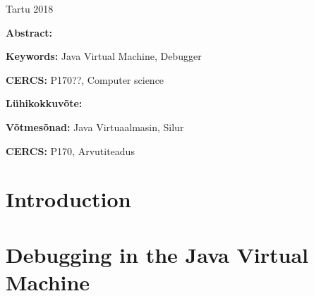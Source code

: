 \documentclass{style/bachelor-thesis}
\begin{document}
\vfill
\centerline{Tartu 2018}


\pagebreak
\listoftodos[Todos]

\pagebreak

\noindent\textbf{\large \articleName}
\vspace*{3ex}
\begin{flushleft}
  \textbf{Abstract:} %
\end{flushleft}


\vspace*{3ex}
\begin{flushleft}
  \textbf{Keywords:} Java Virtual Machine, Debugger
\end{flushleft}
\vspace*{3ex}

\noindent\textbf{CERCS:} P170??, Computer science

\vspace*{5ex}
\noindent\textbf{\large \articleNameEE}
\vspace*{3ex}

\begin{flushleft}
  \textbf{Lühikokkuvõte:} %
\end{flushleft}
\vspace*{3ex}

\begin{flushleft}
  \textbf{Võtmesõnad:} Java Virtuaalmasin, Silur 
\end{flushleft}
\vspace*{3ex}

\noindent\textbf{CERCS:} P170, Arvutiteadus

\newpage




\tableofcontents

\pagebreak


\section{Introduction}


\pagebreak

\section{Debugging in the Java Virtual Machine}
\end{document}
